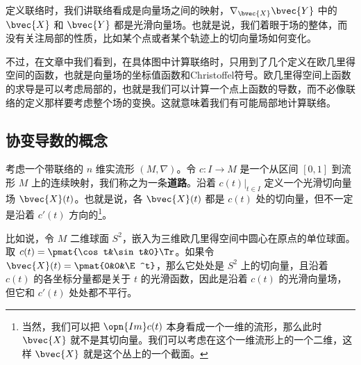 



定义联络时，我们讲联络看成是向量场之间的映射，$\nabla_{\bvec{X}}\bvec{Y}$ 中的 $\bvec{X}$ 和 $\bvec{Y}$ 都是光滑向量场。也就是说，我们着眼于场的整体，而没有关注局部的性质，比如某个点或者某个轨迹上的切向量场如何变化。

不过，在文章中我们看到，在具体图中计算联络时，只用到了几个定义在欧几里得空间的函数，也就是向量场的坐标值函数和Christoffel符号。欧几里得空间上函数的求导是可以考虑局部的，也就是我们可以计算一个点上函数的导数，而不必像联络的定义那样要考虑整个场的变换。这就意味着我们有可能局部地计算联络。

\subsection{协变导数的概念}

考虑一个带联络的 $n$ 维实流形 $(M, \nabla)$。令 $c:I\to M$ 是一个从区间 $[0, 1]$ 到流形 $M$ 上的连续映射，我们称之为一条\textbf{道路}。沿着 $c(t)|_{t\in I}$ 定义一个光滑切向量场 $\bvec{X}(t)$。也就是说，各 $\bvec{X}(t)$ 都是 $c(t)$ 处的切向量，但不一定是沿着 $c'(t)$ 方向的\footnote{当然，我们可以把 $\opn{Im}c(t)$ 本身看成一个一维的流形，那么此时 $\bvec{X}$ 就不是其切向量。我们可以考虑在这个一维流形上的一个二维，这样 $\bvec{X}$ 就是这个丛上的一个截面。}。

比如说，令 $M$ 二维球面 $S^2$，嵌入为三维欧几里得空间中圆心在原点的单位球面。取 $c(t)=\pmat{\cos t&\sin t&0}\Tr$。如果令 $\bvec{X}(t)=\pmat{0&0&\E^t}$，那么它处处是 $S^2$ 上的切向量，且沿着 $c(t)$ 的各坐标分量都是关于 $t$ 的光滑函数，因此是沿着 $c(t)$ 的光滑向量场，但它和 $c'(t)$ 处处都不平行。



